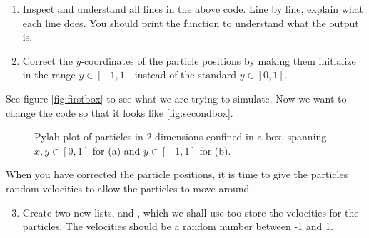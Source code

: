 \documentclass{article}
\begin{document}
\begin{enumerate}
  \item Inspect and understand all lines in the above code.
    Line by line, explain what each line does.
    You should print the  function
    to understand what the output is.

  \item Correct the $y$-coordinates of the particle positions by making them
    initialize in the range $y \in [-1,1]$ instead of the standard $y \in [0,1]$.
\end{enumerate}

See figure \ref{fig:firstbox} to see what we are trying to simulate.
Now we want to change the code so that it looks like \ref{fig:secondbox}.

\begin{figure}[htb]
  \centering
  \caption{
    Pylab plot of particles in 2 dimensions confined in a box,
    spanning $x, y \in [0,1]$ for (a) and $y \in [-1,1]$ for (b).
  }
\end{figure}


\newpage

When you have corrected the particle positions, it is time to give the
particles random velocities to allow the particles to move around.

\begin{enumerate}
  \setcounter{enumi}{2}
  \item Create
    two new lists,  and , which we shall use too
    store the velocities for the particles.
    The velocities should be a random number between -1 and 1.
\end{enumerate}
\end{document}
